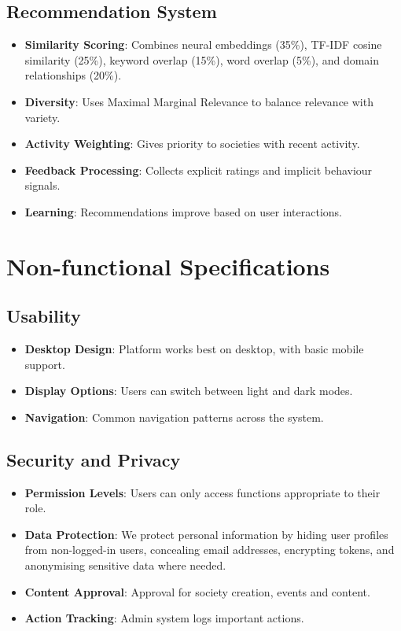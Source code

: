 \subsection{Recommendation System}
\begin{itemize}
    \item \textbf{Similarity Scoring}: Combines neural embeddings (35\%), TF-IDF cosine similarity (25\%), keyword overlap (15\%), word overlap (5\%), and domain relationships (20\%).
    \item \textbf{Diversity}: Uses Maximal Marginal Relevance to balance relevance with variety.
    \item \textbf{Activity Weighting}: Gives priority to societies with recent activity.
    \item \textbf{Feedback Processing}: Collects explicit ratings and implicit behaviour signals.
    \item \textbf{Learning}: Recommendations improve based on user interactions.
\end{itemize}

\section{Non-functional Specifications}

\subsection{Usability}
\begin{itemize}
    \item \textbf{Desktop Design}: Platform works best on desktop, with basic mobile support.
    \item \textbf{Display Options}: Users can switch between light and dark modes.
    \item \textbf{Navigation}: Common navigation patterns across the system.
\end{itemize}

\subsection{Security and Privacy}
\begin{itemize}
    \item \textbf{Permission Levels}: Users can only access functions appropriate to their role.
    \item \textbf{Data Protection}: We protect personal information by hiding user profiles from non-logged-in users, concealing email addresses, encrypting tokens, and anonymising sensitive data where needed.
    \item \textbf{Content Approval}:  Approval for society creation, events and content.
    \item \textbf{Action Tracking}: Admin system logs important actions.
\end{itemize}

